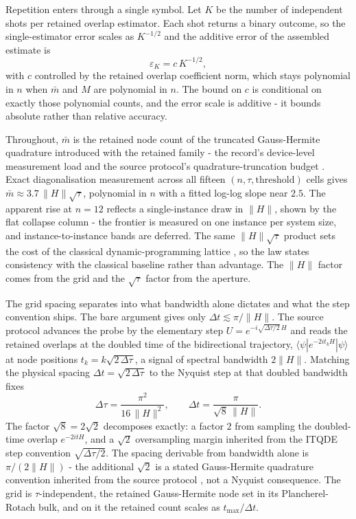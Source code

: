 Repetition enters through a single symbol. Let $K$ be the number of independent shots per retained overlap estimator. Each shot returns a binary outcome, so the single-estimator error scales as $K^{-1/2}$ and the additive error of the assembled estimate is
\begin{equation}\label{def:shot-budget-K}
\varepsilon_K = c\,K^{-1/2},
\end{equation}
with $c$ controlled by the retained overlap coefficient norm, which stays polynomial in $n$ when $\bar m$ and $M$ are polynomial in $n$. The bound on $c$ is conditional on exactly those polynomial counts, and the error scale is additive - it bounds absolute rather than relative accuracy.

Throughout, $\bar m$ is the retained node count of the truncated Gauss-Hermite quadrature introduced with the retained family - the record's device-level measurement load and the source protocol's quadrature-truncation budget \cite{mccaul2025snacks}. Exact diagonalisation measurement across all fifteen $(n, \tau, \mathrm{threshold})$ cells gives $\bar m \approx 3.7\,\|H\|\sqrt{\tau}$, polynomial in $n$ with a fitted log-log slope near $2.5$. The apparent rise at $n = 12$ reflects a single-instance draw in $\|H\|$, shown by the flat collapse column - the frontier is measured on one instance per system size, and instance-to-instance bands are deferred. The same $\|H\|\sqrt{\tau}$ product sets the cost of the classical dynamic-programming lattice \cite{bellman1957dp}, so the law states consistency with the classical baseline rather than advantage. The $\|H\|$ factor comes from the grid and the $\sqrt{\tau}$ factor from the aperture.

The grid spacing separates into what bandwidth alone dictates and what the step convention ships. The bare argument gives only $\Delta t \lesssim \pi/\|H\|$. The source protocol advances the probe by the elementary step $U = e^{-i\sqrt{\Delta\tau/2}\,H}$ and reads the retained overlaps at the doubled time of the bidirectional trajectory, $\langle\psi|e^{-2it_kH}|\psi\rangle$ at node positions $t_k = k\sqrt{2\,\Delta\tau}$, a signal of spectral bandwidth $2\|H\|$. Matching the physical spacing $\Delta t = \sqrt{2\,\Delta\tau}$ to the Nyquist step at that doubled bandwidth fixes
\begin{equation}\label{res:bandwidth-grid}
\Delta\tau = \frac{\pi^2}{16\,\|H\|^2},
\qquad
\Delta t = \frac{\pi}{\sqrt{8}\,\|H\|} .
\end{equation}
The factor $\sqrt{8} = 2\sqrt{2}$ decomposes exactly: a factor $2$ from sampling the doubled-time overlap $e^{-2itH}$, and a $\sqrt{2}$ oversampling margin inherited from the ITQDE step convention $\sqrt{\Delta\tau/2}$. The spacing derivable from bandwidth alone is $\pi/(2\|H\|)$ - the additional $\sqrt{2}$ is a stated Gauss-Hermite quadrature convention inherited from the source protocol \cite{mccaul2025snacks,leamer2024emulation}, not a Nyquist consequence. The grid is $\tau$-independent, the retained Gauss-Hermite node set in its Plancherel-Rotach bulk, and on it the retained count scales as $t_{\max}/\Delta t$.

